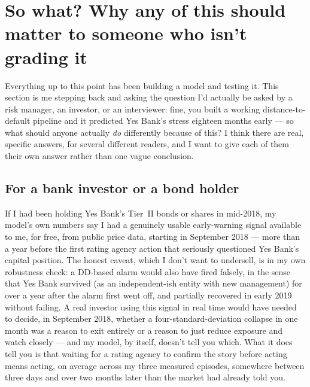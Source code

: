 \section{So what? Why any of this should matter to someone who isn't grading it}

Everything up to this point has been building a model and testing it. This section is me stepping back and asking the question I'd actually be asked by a risk manager, an investor, or an interviewer: fine, you built a working distance-to-default pipeline and it predicted Yes Bank's stress eighteen months early — so what should anyone actually \emph{do} differently because of this? I think there are real, specific answers, for several different readers, and I want to give each of them their own answer rather than one vague conclusion.

\subsection{For a bank investor or a bond holder}
If I had been holding Yes Bank's Tier~II bonds or shares in mid-2018, my model's own numbers say I had a genuinely usable early-warning signal available to me, for free, from public price data, starting in September 2018 — more than a year before the first rating agency action that seriously questioned Yes Bank's capital position. The honest caveat, which I don't want to undersell, is in my own robustness check: a DD-based alarm would also have fired falsely, in the sense that Yes Bank survived (as an independent-ish entity with new management) for over a year after the alarm first went off, and partially recovered in early 2019 without failing. A real investor using this signal in real time would have needed to decide, in September 2018, whether a four-standard-deviation collapse in one month was a reason to exit entirely or a reason to just reduce exposure and watch closely — and my model, by itself, doesn't tell you which. What it does tell you is that waiting for a rating agency to confirm the story before acting means acting, on average across my three measured episodes, somewhere between three days and over two months later than the market had already told you.


